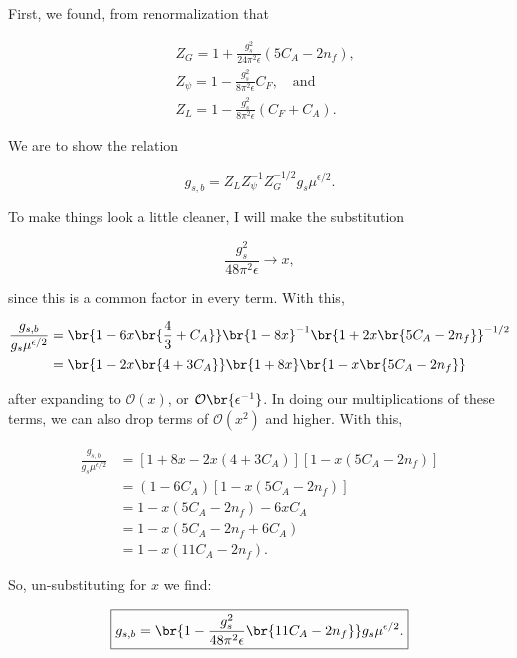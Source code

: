 \section{}

First, we found, from renormalization that

\begin{align}
  &Z_G = 1 + \frac{g_s^2}{24\pi^2\epsilon}(5C_A - 2n_f), \\
  &Z_\psi = 1 - \frac{g_s^2}{8\pi^2\epsilon}C_F, \quad\text{and} \\
  &Z_L = 1 - \frac{g_s^2}{8\pi^2\epsilon}(C_F + C_A).
\end{align}

We are to show the relation

\begin{equation}
  g_{s,b} = Z_L Z_\psi^{-1} Z_G^{-1/2} g_s \mu^{\epsilon/2}.
\end{equation}

To make things look a little cleaner, I will make the substitution

\begin{equation}
  \frac{g_s^2}{48\pi^2\epsilon} \rightarrow x,
\end{equation}

since this is a common factor in every term. With this,

\begin{align}
  \frac{g_{s,b}}{g_s \mu^{\epsilon/2}} &= \br{1 - 6x\br{\frac{4}{3} + C_A}}\br{1 - 8x}^{-1}\br{1 + 2x\br{5C_A - 2n_f}}^{-1/2} \\
  &= \br{1 - 2x\br{4 + 3C_A}}\br{1 + 8x}\br{1 - x\br{5C_A - 2n_f}}
\end{align}

after expanding to $\mathcal{O}(x)$, or $\mathcal{O}\br{\epsilon^{-1}}$. In doing our multiplications of these terms, we can also drop terms of $\mathcal{O}(x^2)$ and higher. With this,

\begin{align}
  \frac{g_{s,b}}{g_s \mu^{\epsilon/2}} &= [1 + 8x - 2x(4 + 3C_A)][1 - x(5C_A - 2n_f)] \\
          &= (1 - 6C_A)[1 - x(5C_A - 2n_f)] \\
          &= 1 - x(5C_A - 2n_f) - 6xC_A \\
          &= 1 - x(5C_A - 2n_f + 6C_A) \\
          &= 1 - x(11C_A - 2n_f).
\end{align}

So, un-substituting for $x$ we find:

\begin{equation}
  \boxed{g_{s,b} = \br{1 - \frac{g_s^2}{48\pi^2\epsilon}\br{11C_A - 2n_f}}g_s \mu^{\epsilon/2}.}
\end{equation}

